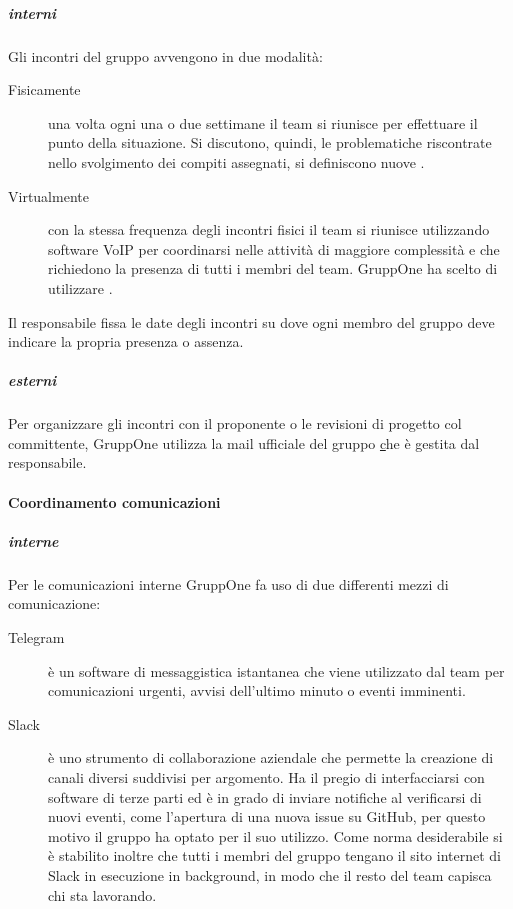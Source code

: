 \documentclass[../norme-di-progetto.tex]{subfiles}
\begin{document}
\subparagraph{interni}%
\label{subp:coordinamento_incontri/interni}
Gli incontri del gruppo avvengono in due modalità:
\begin{description}
  \item [Fisicamente] una volta ogni una o due settimane il team si riunisce per effettuare il punto della situazione. Si discutono, quindi, le problematiche riscontrate nello svolgimento dei compiti assegnati, si definiscono nuove .
  \item [Virtualmente] con la stessa frequenza degli incontri fisici il team si riunisce utilizzando software VoIP per coordinarsi nelle attività di maggiore complessità e che richiedono la presenza di tutti i membri del team. GruppOne ha scelto di utilizzare .
\end{description}
Il responsabile fissa le date degli incontri su  dove ogni membro del gruppo deve indicare la propria presenza o assenza.

\subparagraph{esterni}%
\label{subp:coordinamento_incontri/esterni}
Per organizzare gli incontri con il proponente o le revisioni di progetto col committente, GruppOne utilizza la mail ufficiale del gruppo \href{gruppone.swe@gmail.com} che è gestita dal responsabile.

\paragraph{Coordinamento comunicazioni}%
\label{par:coordinamento_comunicazioni}

\subparagraph{interne}%
\label{subp:coordinamento_comunicazioni/interne}
Per le comunicazioni interne GruppOne fa uso di due differenti mezzi di comunicazione:
\begin{description}
  \item [Telegram] è un software di messaggistica istantanea che viene utilizzato dal team per comunicazioni urgenti, avvisi dell'ultimo minuto o eventi imminenti.
  \item [Slack] è uno strumento di collaborazione aziendale che permette la creazione di canali diversi suddivisi per argomento. Ha il pregio di interfacciarsi con software di terze parti ed è in grado di inviare notifiche al verificarsi di nuovi eventi, come l'apertura di una nuova issue su GitHub, per questo motivo il gruppo ha optato per il suo utilizzo. Come norma desiderabile si è stabilito inoltre che tutti i membri del gruppo tengano il sito internet di Slack in esecuzione in background, in modo che il resto del team capisca chi sta lavorando.
\end{description}
\end{document}
